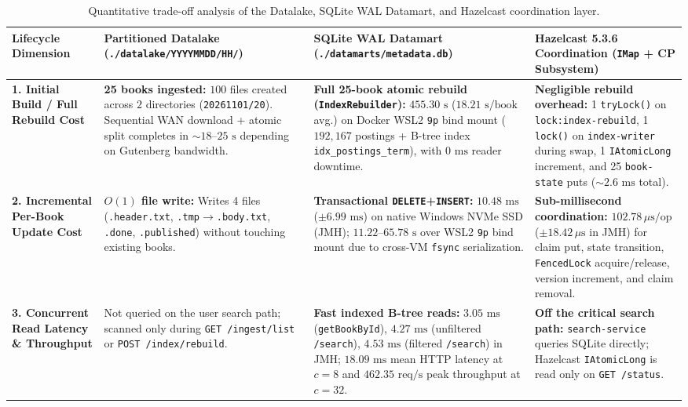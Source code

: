 \documentclass[10pt,a4paper]{article}
\begin{document}
\begin{table}[!htbp]
\centering
\caption{Quantitative trade-off analysis of the Datalake, SQLite WAL Datamart, and Hazelcast coordination layer.}
\label{tab:storage_tradeoffs}
\scriptsize
\setlength{\tabcolsep}{4pt}
\renewcommand{\arraystretch}{1.18}
\begin{tabularx}{\textwidth}{L{2.7cm} Y Y Y}
\toprule
\textbf{Lifecycle Dimension} & \textbf{Partitioned Datalake (\texttt{./datalake/YYYYMMDD/HH/})} & \textbf{SQLite WAL Datamart (\texttt{./datamarts/metadata.db})} & \textbf{Hazelcast 5.3.6 Coordination (\texttt{IMap} + CP Subsystem)} \\
\midrule
\textbf{1. Initial Build / Full Rebuild Cost} & \textbf{25 books ingested:} $100$ files created across $2$ directories (\texttt{20261101/20}). Sequential WAN download + atomic split completes in $\sim 18\text{--}25\text{ s}$ depending on Gutenberg bandwidth. & \textbf{Full 25-book atomic rebuild (\texttt{IndexRebuilder}):} $455.30\text{ s}$ ($18.21\text{ s/book}$ avg.) on Docker WSL2 \texttt{9p} bind mount ($192,167$ postings + B-tree index \texttt{idx\_postings\_term}), with $0\text{ ms}$ reader downtime. & \textbf{Negligible rebuild overhead:} 1 \texttt{tryLock()} on \texttt{lock:index-rebuild}, 1 \texttt{lock()} on \texttt{index-writer} during swap, 1 \texttt{IAtomicLong} increment, and 25 \texttt{book-state} puts ($\sim 2.6\text{ ms}$ total). \\
\addlinespace[2pt]
\textbf{2. Incremental Per-Book Update Cost} & \textbf{$O(1)$ file write:} Writes 4 files (\texttt{.header.txt}, \texttt{.tmp}$\to$\texttt{.body.txt}, \texttt{.done}, \texttt{.published}) without touching existing books. & \textbf{Transactional \texttt{DELETE}+\texttt{INSERT}:} $10.48\text{ ms}$ ($\pm 6.99\text{ ms}$) on native Windows NVMe SSD (JMH); $11.22\text{--}65.78\text{ s}$ over WSL2 \texttt{9p} bind mount due to cross-VM \texttt{fsync} serialization. & \textbf{Sub-millisecond coordination:} $102.78\,\mu\text{s/op}$ ($\pm 18.42\,\mu\text{s}$ in JMH) for claim put, state transition, \texttt{FencedLock} acquire/release, version increment, and claim removal. \\
\addlinespace[2pt]
\textbf{3. Concurrent Read Latency \& Throughput} & Not queried on the user search path; scanned only during \texttt{GET /ingest/list} or \texttt{POST /index/rebuild}. & \textbf{Fast indexed B-tree reads:} $3.05\text{ ms}$ (\texttt{getBookById}), $4.27\text{ ms}$ (unfiltered \texttt{/search}), $4.53\text{ ms}$ (filtered \texttt{/search}) in JMH; $18.09\text{ ms}$ mean HTTP latency at $c=8$ and $462.35\text{ req/s}$ peak throughput at $c=32$. & \textbf{Off the critical search path:} \texttt{search-service} queries SQLite directly; Hazelcast \texttt{IAtomicLong} is read only on \texttt{GET /status}. \\

\end{tabularx}
\end{table}
\end{document}
